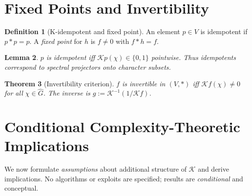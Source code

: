 \documentclass[11pt]{article}
\theoremstyle{plain}
\newtheorem{theorem}{Theorem}[section]
\newtheorem{lemma}[theorem]{Lemma}
\theoremstyle{definition}
\newtheorem{definition}[theorem]{Definition}
\theoremstyle{remark}
\begin{document}
\section{Fixed Points and Invertibility}
\begin{definition}[K-idempotent and fixed point]
An element $p \in V$ is idempotent if $p \ast p = p$. A \emph{fixed point} for $h$ is $f \neq 0$ with $f \ast h = f$.
\end{definition}
\begin{lemma}
$p$ is idempotent iff $\mathcal{K}p(\chi) \in \{0,1\}$ pointwise. Thus idempotents correspond to spectral projectors onto character subsets.
\end{lemma}
\begin{theorem}[Invertibility criterion]
$f$ is invertible in $(V, \ast)$ iff $\mathcal{K}f(\chi) \neq 0$ for all $\chi \in \widehat{G}$. The inverse is $g := \mathcal{K}^{-1}(1/\mathcal{K}f)$.
\end{theorem}
\section{Conditional Complexity-Theoretic Implications}
We now formulate \emph{assumptions} about additional structure of $\mathcal{K}$ and derive implications. No algorithms or exploits are specified; results are \emph{conditional} and conceptual.
\end{document}
